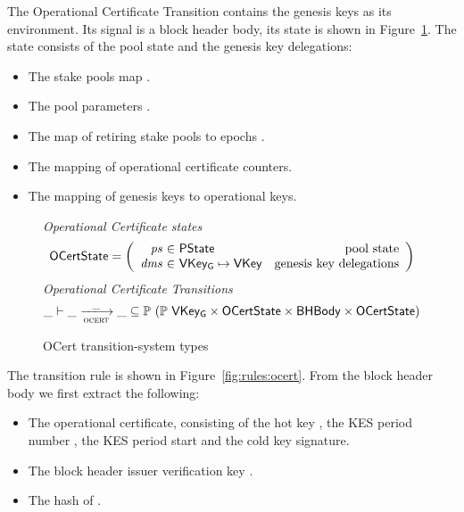 The Operational Certificate Transition contains the genesis keys as its environment.
Its signal is a block header body, its state is shown in
Figure~\ref{fig:ts-types:ocert}. The state consists of the pool state and the genesis
key delegations:

\begin{itemize}
\item The stake pools map .
\item The pool parameters .
\item The map of retiring stake pools to epochs .
\item The mapping  of operational certificate counters.
\item The mapping of genesis keys to operational keys.
\end{itemize}

\begin{figure}
  \emph{Operational Certificate states}
  \begin{equation*}
    \OCertState =
    \left(
      \begin{array}{r@{~\in~}lr}
        \var{ps} & \PState & \text{pool state} \\
        \var{dms} & \VKeyGen\mapsto\VKey & \text{genesis key delegations} \\
      \end{array}
    \right)
  \end{equation*}
  \emph{Operational Certificate Transitions}
  \begin{equation*}
    \_ \vdash \var{\_} \trans{ocert}{\_} \var{\_} \subseteq
    \powerset (\powerset{\VKeyGen} \times \OCertState \times \BHBody \times \OCertState)
  \end{equation*}
  \caption{OCert transition-system types}
  \label{fig:ts-types:ocert}
\end{figure}

The transition rule is shown in Figure~\ref{fig:rules:ocert}. From the block
header body  we first extract the following:

\begin{itemize}
\item The operational certificate, consisting of the hot key , the
  KES period number , the KES period start  and the cold key
  signature.
\item The block header issuer verification key .
\item The hash  of .
\end{itemize}


